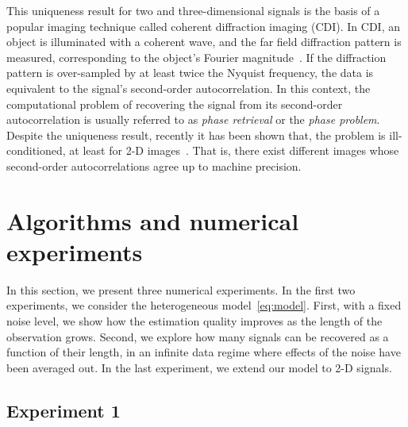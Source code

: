 \documentclass[12pt]{article}
\newcommand{\1}{\mathbf{1}}
\theoremstyle{plain}
\theoremstyle{definition}
\theoremstyle{remark}
\theoremstyle{plain}
\theoremstyle{remark}
\theoremstyle{plain}
\theoremstyle{plain}
\theoremstyle{plain}
\numberwithin{equation}{section}
\begin{document}
This uniqueness result for two and three-dimensional signals is the basis of a popular imaging technique called coherent diffraction imaging (CDI). In CDI, an object is
illuminated with a coherent wave, and the far field diffraction pattern  is measured, corresponding to the object's Fourier magnitude~\cite{miao1999extending,shechtman2015phase}. 
If the diffraction pattern is over-sampled by at least  twice the Nyquist frequency,  the data is equivalent to the signal's second-order autocorrelation. In this context, the computational problem of recovering the signal from its second-order autocorrelation is usually referred to as \emph{phase retrieval} or the \emph{phase problem}.
Despite the uniqueness result, recently it has been shown that, the problem is  ill-conditioned, at least for 2-D images~\cite{barnett2018geometry}. That is, there exist different images whose second-order autocorrelations agree up to machine precision. 



\section{Algorithms and numerical experiments} \label{sec:numerics}

In this section, we present three numerical experiments. In the first two experiments, we consider the heterogeneous model~\eqref{eq:model}. First, with a fixed noise level, we show how the estimation quality improves as the length of the observation grows. Second, we explore how many signals can be recovered as a function of their length, in an infinite data regime where effects of the noise have been averaged out. In the last experiment, we extend our model to 2-D signals.

\subsection{Experiment 1} 
\label{sec:XP1}
\end{document}
